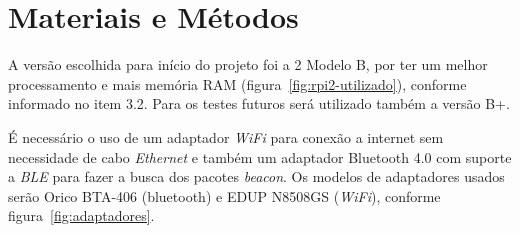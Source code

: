 \documentclass[
	12pt,				%
	openright,			%
	oneside,			%
	a4paper,			%
	chapter=TITLE,		%
	english,			%
	brazil				%
	]{abntex2}
\begin{document}
{%
\chapter{Materiais e Métodos}\label{cap:materiais-e-metodos}

A versão escolhida para início do projeto foi a 2 Modelo B, por ter um melhor processamento e mais memória RAM (figura~\ref{fig:rpi2-utilizado}), conforme informado no item 3.2. Para os testes futuros será utilizado também a versão B+.

\begin{figure}[htb]
\end{figure}

É necessário o uso de um adaptador \textit{WiFi} para conexão a internet sem necessidade de cabo \textit{Ethernet} e também um adaptador Bluetooth 4.0 com suporte a \textit{BLE} para fazer a busca dos pacotes \textit{beacon}. Os modelos de adaptadores usados serão Orico BTA-406 (bluetooth) e EDUP N8508GS (\textit{WiFi}), conforme figura~\ref{fig:adaptadores}.

\begin{figure}[htb]
\end{figure}

}
\end{document}
